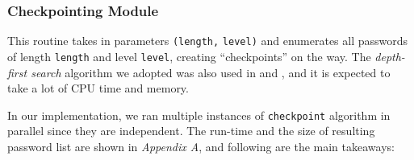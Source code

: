 \documentclass{article} %
\theoremstyle{definition}
\theoremstyle{theorem}
\theoremstyle{remark}
\theoremstyle{remark}
\begin{document}
\subsubsection{Checkpointing Module}
\par\quad This routine takes in parameters \texttt{(length,} \texttt{level)} and enumerates all passwords of length \texttt{length} and level \texttt{level}, creating ``checkpoints'' on the way. The \emph{depth-first search} algorithm we adopted was also used in \cite{probabilistic} and \cite{guessability}, and it is expected to take a lot of CPU time and memory.

\par\quad In our implementation, we ran multiple instances of \texttt{checkpoint} algorithm in parallel since they are independent. The run-time and the size of resulting password list are shown in \emph{Appendix A}, and following are the main takeaways:
\end{document}

